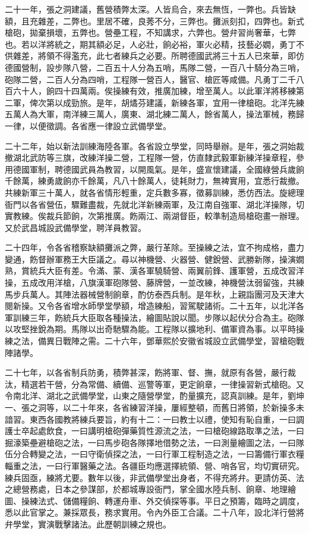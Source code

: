 \begin{pinyinscope}
二十一年，張之洞建議，舊營積弊太深。人皆烏合，來去無恆，一弊也。兵皆缺額，且充雜差，二弊也。里居不確，良莠不分，三弊也。攤派刻扣，四弊也。新式槍砲，拋棄損壞，五弊也。營壘工程，不知講求，六弊也。營弁習尚奢華，七弊也。若以洋將統之，期其額必足，人必壯，餉必裕，軍火必精，技藝必嫺，勇丁不供雜差，將領不得濫充，此七者練兵之必要。所聘德國武將三十五人已來華，即仿德國營制，設步隊八營，二百五十人分為五哨，馬隊二營，一百八十騎分為三哨，砲隊二營，二百人分為四哨，工程隊一營百人，醫官、槍匠等咸備。凡勇丁二千八百六十人，餉四十四萬兩。俟操練有效，推廣加練，增至萬人。以此軍洋將移練第二軍，俾次第以成勁旅。是年，胡燏芬建議，新練各軍，宜用一律槍砲。北洋先練五萬人為大軍，南洋練三萬人，廣東、湖北練二萬人，餘省萬人，操法軍械，務歸一律，以便徵調。各省應一律設立武備學堂。

二十二年，始以新法訓練海陸各軍。各省設立學堂，同時舉辦。是年，張之洞始裁撤湖北武防等三旗，改練洋操二營，工程隊一營，仿直隸武毅軍新練洋操章程，參用德國軍制，聘德國武員為教習，以開風氣。是年，盛宣懷建議，全國綠營兵歲餉千餘萬，練勇歲餉亦千餘萬，凡八十餘萬人，徒耗財力，無裨實用，宜悉行裁撤。共練新軍三十萬人，就各省情形輕重，定兵數多寡，徵募訓練，悉仿西法。旋總理衙門以各省營伍，驟難盡裁，先就北洋新練兩軍，及江南自強軍、湖北洋操隊，切實教練。俟裁兵節餉，次第推廣。飭兩江、兩湖督臣，較準制造局槍砲畫一辦理。又於武昌城設武備學堂，聘洋員教習。

二十四年，令各省稽察缺額攤派之弊，嚴行革除。至操練之法，宜不拘成格，盡力變通，飭督辦軍務王大臣議之。尋以神機營、火器營、健銳營、武勝新隊，操演嫺熟，賞統兵大臣有差。令滿、蒙、漢各軍驍騎營、兩翼前鋒、護軍營，五成改習洋操，五成改用洋槍，八旗漢軍砲隊營、藤牌營，一並改練，神機營汰弱留強，共練馬步兵萬人。其陣法器械營制餉章，酌仿泰西兵制。是年秋，上親詣團河及天津大閱新操。又令各省增水師學堂學額，增造練船，習駕駛諸術。二十五年，以北洋各軍訓練三年，飭統兵大臣取各種操法，繪圖貼說以聞。步隊以起伏分合為主。砲隊以攻堅挫銳為期。馬隊以出奇馳驟為能。工程隊以擴地利、備軍資為事。以平時操練之法，備異日戰陣之需。二十六年，鄧華熙於安徽省城設立武備學堂，習槍砲戰陣諸學。

二十七年，以各省制兵防勇，積弊甚深，飭將軍、督、撫，就原有各營，嚴行裁汰，精選若干營，分為常備、續備、巡警等軍，更定餉章，一律操習新式槍砲。又令南北洋、湖北之武備學堂，山東之隨營學堂，酌量擴充，認真訓練。是年，劉坤一、張之洞等，以二十年來，各省練習洋操，屢經整頓，而舊日將領，於新操多未諳習。東西各國教將練兵要旨，約有十二：一曰教士以禮，使知有恥自重，一曰調護士卒起處飲食，一曰講明槍砲彈藥質性源流之法，一曰槍砲線路取準之法，一曰掘濠築壘避槍砲之法，一曰馬步砲各隊擇地借勢之法，一曰測量繪圖之法，一曰隊伍分合轉變之法，一曰守衛偵探之法，一曰行軍工程制造之法，一曰籌備行軍衣糧輜重之法，一曰行軍醫藥之法。各疆臣均應選擇統領、營、哨各官，均切實研究。練兵固亟，練將尤要。數年以後，非武備學堂出身者，不得充將弁。更請仿英、法之總營務處，日本之參謀部，於都城專設衙門，掌全國水陸兵制、餉章、地理繪圖、操練法式、儲備糧餉、轉運舟車、外交偵探等事。平日之預籌，臨時之調度，悉以此官掌之。兼採眾長，務求實用。令內外臣工合議。二十八年，設北洋行營將弁學堂，實演戰擊諸法。此歷朝訓練之規也。


\end{pinyinscope}